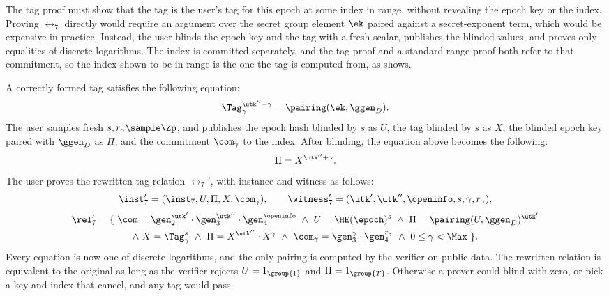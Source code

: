 The tag proof must show that the tag is the user's
tag for this epoch at some index in range, without revealing the epoch key or
the index. Proving $\rel_7$ directly would require an argument over the secret
group element $\ek$ paired against a secret-exponent term, which would be
expensive in practice. Instead, the user blinds the epoch key and the tag with a
fresh scalar, publishes the blinded values, and proves only equalities of
discrete logarithms. The index is committed separately, and the tag proof and
a standard range proof both refer to that commitment, so the index shown to
be in range is the one the tag is computed from, as 
shows.

A correctly formed tag satisfies the following equation:
%
\begin{equation*}
  \Tag_\gamma^{\utk''+\gamma} = \pairing(\ek,\ggen_D).
\end{equation*}
%
The user samples fresh $s, r_\gamma \sample \Zp$, and publishes the epoch hash
blinded by $s$ as $U$, the tag blinded by $s$ as $X$, the blinded epoch key
paired with $\ggen_D$ as $\Pi$, and the commitment $\com_\gamma$ to the index.
After blinding, the equation above becomes the following:
%
\begin{equation*}
  \Pi = X^{\utk''+\gamma}.
\end{equation*}
%
The user proves the rewritten tag relation $\rel_7'$, with instance and witness as
follows:
%
\begin{equation*}
  \inst_7' = (\inst_7, U, \Pi, X, \com_\gamma), \qquad \witness_7' =
(\utk', \utk'', \openinfo, s, \gamma, r_\gamma),
\end{equation*}
%
\begin{equation*} \begin{gathered}
  \rel_7' = \{\ \com = \gen_2^{\utk'}\cdot\gen_3^{\utk''}\cdot\gen_4^{\openinfo}
\ \wedge \ U = \HE(\epoch)^s \ \wedge \ \Pi = \pairing(U,\ggen_D)^{\utk'} \\
\wedge \ X = \Tag_\gamma^s \ \wedge \ \Pi = X^{\utk''}\cdot X^{\gamma} \ \wedge
\ \com_\gamma = \gen_3^{\gamma}\cdot\gen_4^{r_\gamma} \ \wedge \ 0 \leq \gamma <
\Max\ \}.
\end{gathered} \end{equation*}
%
Every equation is now one of discrete logarithms, and the only pairing is
computed by the verifier on public data. The rewritten relation is equivalent
to the original as long as the verifier rejects $U = 1_{\group{1}}$ and $\Pi = 1_{\group{T}}$. Otherwise a
prover could blind with zero, or pick a key and index that cancel, and any tag
would pass.

